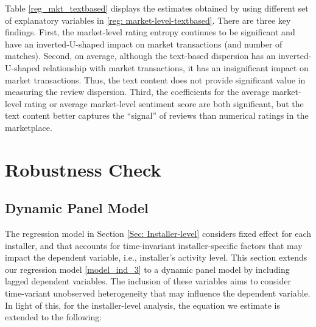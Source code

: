 \documentclass[msom,blindrev]{informs3}
\begin{document}
	
	Table \ref{reg_mkt_textbased} displays the estimates obtained by using different set of explanatory variables in \eqref{reg: market-level-textbased}. There are three key findings. First, the  market-level rating entropy continues to be significant and have an inverted-U-shaped impact on market transactions (and number of matches). Second, on average, although the text-based dispersion has an inverted-U-shaped relationship with market transactions, it has an insignificant impact on market transactions. Thus, the text content does not provide significant value in measuring the review dispersion.  Third, the coefficients for the average market-level rating or average market-level sentiment score are both significant, but the text content better captures the ``signal'' of reviews than numerical ratings in the marketplace.
	
	
	
	
	
	
	
	
	
	\section{Robustness Check} \label{Sec: Robustness}
	
	\subsection{Dynamic Panel Model}
	
	The regression model in Section \ref{Sec: Installer-level} considers fixed effect for each installer, and that accounts for time-invariant installer-specific factors that may impact the dependent variable, i.e., installer's activity level. This section extends our regression model  \eqref{model_ind_3} to a dynamic panel model by including lagged dependent variables. The inclusion of these variables aims to consider time-variant unobserved heterogeneity that may influence the dependent variable. In light of this, for the installer-level analysis, the equation we estimate is extended to the following:
	
\end{document}
